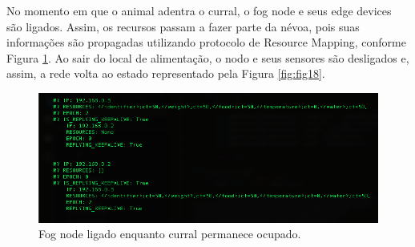 \documentclass[portuguese,oneside]{tcc}
\begin{document}
No momento em que o animal adentra o curral, o fog node e seus edge devices são ligados.
Assim, os recursos passam a fazer parte da névoa, pois suas informações são propagadas utilizando protocolo de Resource Mapping, conforme Figura \ref{fig:fig19}.
Ao sair do local de alimentação, o nodo e seus sensores são desligados e, assim, a rede volta ao estado representado pela Figura \ref{fig:fig18}.

\begin{figure}[H]
  \centering\includegraphics[width=.9\textwidth]{fig19.png}
  \caption [Fog node ligado enquanto curral permanece ocupado]
  {\label{fig:fig19} Fog node ligado enquanto curral permanece ocupado.}
\end{figure}

  
  
\end{document}

